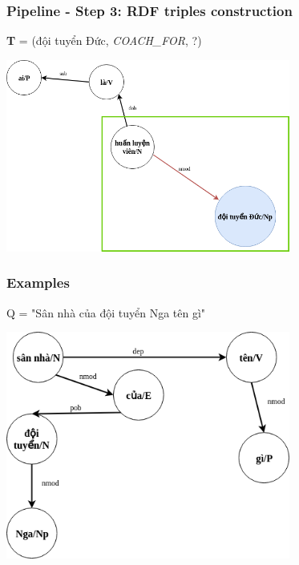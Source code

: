 \documentclass{beamer}
\begin{document}
\begin{frame}
	\frametitle{Pipeline - Step 3: RDF triples construction}
	
	\textbf{T} = (đội tuyển Đức, \textit{COACH\_FOR}, ?)
	\begin{center} 
		\centering 
			\includegraphics[width=0.7\textwidth,height=0.7\textheight,keepaspectratio]			{firstextreesimplified3}
			\vspace{0.5cm} 
	\end{center}		
\end{frame}


\begin{frame}
	\frametitle{Examples}
	
	Q = "Sân nhà của đội tuyển Nga tên gì"
	
	\begin{center} 
		\centering 
			\includegraphics[width=0.7\textwidth,height=0.7\textheight,keepaspectratio]{secondextree}
			\vspace{0.5cm} 
	\end{center}
		
\end{frame}
\end{document}
